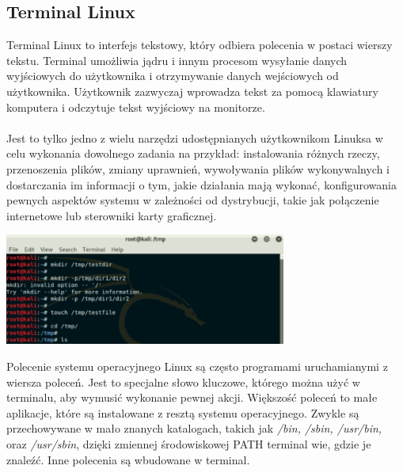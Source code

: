 \documentclass[10pt,a4paper]{report}
\begin{document}
\begin{adjustwidth}{2cm}{2cm}
\section{Terminal Linux}
\begin{minipage}{1\linewidth}
Terminal Linux to interfejs tekstowy, który odbiera polecenia w postaci wierszy tekstu. Terminal umożliwia jądru i innym procesom wysyłanie danych wyjściowych do użytkownika i otrzymywanie danych wejściowych od użytkownika. Użytkownik zazwyczaj wprowadza tekst za pomocą klawiatury komputera i odczytuje tekst wyjściowy na monitorze. \\ \\
Jest to tylko jedno z wielu narzędzi udostępnianych użytkownikom Linuksa w celu wykonania
dowolnego zadania na przykład: instalowania różnych rzeczy, przenoszenia plików, zmiany uprawnień, wywoływania plików wykonywalnych i dostarczania im informacji o tym, jakie działania mają wykonać, konfigurowania pewnych aspektów systemu w zależności od dystrybucji, takie jak połączenie internetowe lub sterowniki karty graficznej.  \\
\end{minipage}
 \begin{minipage}{\linewidth}
\begin{center}
  \includegraphics[width=350px]{img/terminal}
\end{center}
\end{minipage}
\begin{minipage}{1\linewidth}
Polecenie systemu operacyjnego Linux są często programami uruchamianymi z wiersza poleceń. Jest to specjalne słowo kluczowe, którego można użyć w terminalu, aby wymusić wykonanie pewnej akcji. Większość poleceń to małe aplikacje, które są instalowane z resztą systemu operacyjnego. Zwykle są przechowywane w mało znanych katalogach, takich jak \textit{/bin, /sbin, /usr/bin,} oraz \textit{/usr/sbin}, dzięki zmiennej środowiskowej PATH terminal wie, gdzie je znaleźć. Inne polecenia są wbudowane w terminal. \\
\end{minipage}

\end{adjustwidth}
\end{document}
